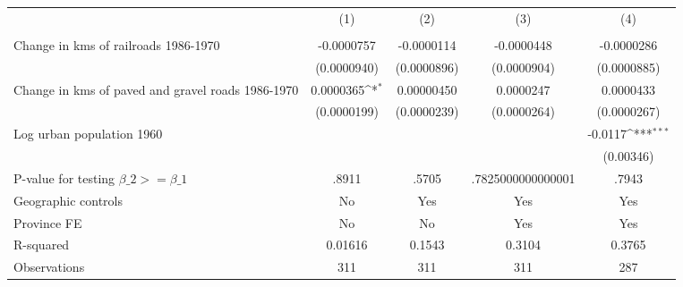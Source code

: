 {
\def\sym#1{\ifmmode^{#1}\else\(^{#1}\)\fi}
\begin{tabular}{l*{4}{c}}
\hline\hline
                &\multicolumn{1}{c}{(1)}&\multicolumn{1}{c}{(2)}&\multicolumn{1}{c}{(3)}&\multicolumn{1}{c}{(4)}\\
                &\multicolumn{1}{c}{}&\multicolumn{1}{c}{}&\multicolumn{1}{c}{}&\multicolumn{1}{c}{}\\
\hline
Change in kms of railroads 1986-1970&-0.0000757         &-0.0000114         &-0.0000448         &-0.0000286         \\
                &(0.0000940)         &(0.0000896)         &(0.0000904)         &(0.0000885)         \\
[1em]
Change in kms of paved and gravel roads 1986-1970&0.0000365\sym{*}  &0.00000450         &0.0000247         &0.0000433         \\
                &(0.0000199)         &(0.0000239)         &(0.0000264)         &(0.0000267)         \\
[1em]
Log urban population 1960&                  &                  &                  &  -0.0117\sym{***}\\
                &                  &                  &                  &(0.00346)         \\
\hline
P-value for testing $\beta\_{2} >= \beta\_{1}$&    .8911         &    .5705         &.7825000000000001         &    .7943         \\
Geographic controls&       No         &      Yes         &      Yes         &      Yes         \\
Province FE     &       No         &       No         &      Yes         &      Yes         \\
R-squared       &  0.01616         &   0.1543         &   0.3104         &   0.3765         \\
Observations    &      311         &      311         &      311         &      287         \\
\hline\hline
\end{tabular}
}
